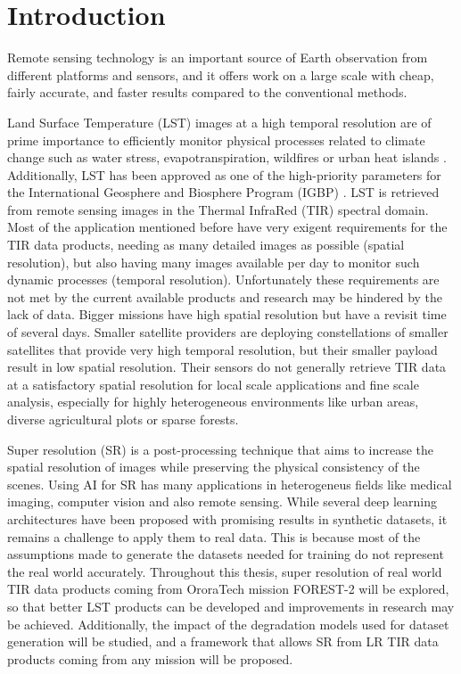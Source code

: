 \section{Introduction} \label{sec:intro}


Remote sensing technology is an important source of Earth observation from different platforms
and sensors, and it offers work on a large scale with cheap, fairly accurate, and faster results compared to the conventional methods.

Land Surface Temperature (LST) images at a high temporal resolution are of prime importance to efficiently monitor physical processes related to climate change such as water stress, evapotranspiration, wildfires or urban heat islands \cite{lst2005}.
Additionally, LST has been approved as one of the high-priority parameters for the International Geosphere and Biosphere Program (IGBP) \cite{townshend94}.
LST is retrieved from remote sensing images in the Thermal InfraRed (TIR) spectral domain.  
Most of the application mentioned before have very exigent requirements for the TIR data products, needing as many detailed images as possible (spatial resolution), but also having many images available per day to monitor such dynamic processes (temporal resolution).
Unfortunately these requirements are not met by the current available products and research may be hindered by the lack of data. 
Bigger missions have high spatial resolution but have a revisit time of several days.
Smaller satellite providers are deploying constellations of smaller satellites that provide very high temporal resolution, but their smaller payload result in low spatial resolution.
Their  sensors do not generally retrieve TIR data at a satisfactory spatial resolution for local scale applications and fine scale analysis, especially for highly heterogeneous environments like urban areas, diverse agricultural plots or sparse forests.

Super resolution (SR) is a post-processing technique that aims to increase the spatial resolution of images while preserving the physical consistency of the scenes.
Using AI for SR has many applications in heterogeneus fields like medical imaging, computer vision and also remote sensing. 
While several deep learning architectures have been proposed with promising results in synthetic datasets, it remains a challenge to apply them to real data.
This is because most of the assumptions made to generate the datasets needed for training do not represent the real world accurately.
Throughout this thesis, super resolution of real world TIR data products coming from OroraTech mission FOREST-2 will be explored, so that better LST products can be developed and improvements in research may be achieved.
Additionally, the impact of the degradation models used for dataset generation will be studied, and a framework that allows SR from LR TIR data products coming from any mission will be proposed.
 
